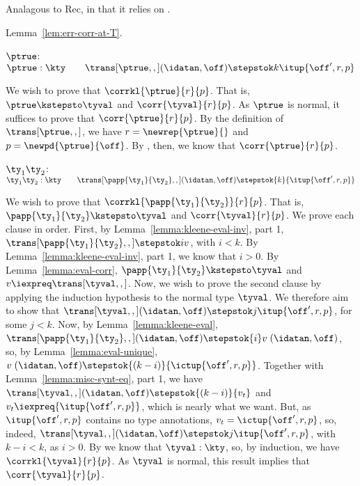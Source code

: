 \begin{list}{\textbf{Proof:}}{
      \setlength{\leftmargin}{0in}
      \setlength{\listparindent}{0in}}
\begin{caseproof}
Analagous to Rec, in that it relies on .
\end{caseproof}

\item Lemma~\ref{lem:err-corr-at-T}.
\begin{caseproof}
\item $\ptrue$: \quad $\ptrue : \kty \qquad
  \trans[\ptrue,,](\idatan,\off) \stepstok k {\itup{\off',r,p}}$

  We wish to prove that $\corrkl{\ptrue}{r}{p}$. That is, $\ptrue \kstepsto \tyval $
    and $\corr{\tyval}{r}{p}$. As $\ptrue$ is normal, it suffices to prove that $\corr{\ptrue}{r}{p}$.
  By the definition of $\trans[\ptrue,,]$, we have $r = \newrep{\ptrue}{}$ and $p = \newpd{\ptrue}{\off}$.
  By , then, we know that
     $\corr{\ptrue}{r}{p}$.

\item ${\ty_1} {\ty_2}$:\quad ${\ty_1} {\ty_2} : \kty \qquad 
  \trans[\papp {\ty_1} {\ty_2},,] (\idatan,\off) \stepstok{k}
  {\itup{\off',r,p}}$

  We wish to prove that $\corrkl{\papp {\ty_1}{\ty_2}}{r}{p}$. That
  is, $\papp {\ty_1} {\ty_2} \kstepsto \tyval $
    and $\corr{\tyval}{r}{p}$.
  We prove each clause in order. First, by Lemma~\ref{lemma:kleene-eval-inv}, part 1,
    $\trans[\papp {\ty_1} {\ty_2},,] \stepstok i v$, with $i < k$.
  By Lemma~\ref{lemma:kleene-eval-inv}, part 1, we know that
    $i > 0$.
  By Lemma~\ref{lemma:eval-corr},
    $\papp {\ty_1} {\ty_2} \kstepsto \tyval$ and $v \iexpreq
    \trans[\tyval,,]$.
  Now, we wish to prove the second clause by applying the induction
  hypothesis to the normal type $\tyval$. We therefore aim to show
  that $\trans[\tyval,,] (\idatan,\off) \stepstok j
  {\itup{\off',r,p}}$, for some $j < k$.
  Now, by Lemma~\ref{lemma:kleene-eval},
    $\trans[\papp {\ty_1} {\ty_2},,] (\idatan,\off) \stepstok{i} v \;
    (\idatan,\off)$, so, by Lemma~\ref{lemma:eval-unique},
     $v \; (\idatan,\off) \stepstok{(k-i)} {\ictup{\off',r,p}}$.
  Together with Lemma~\ref{lemma:misc-synt-eq}, part 1, we have
    $\trans[\tyval,,] (\idatan,\off) \stepstok{(k-i)} {v_t}$ and ${v_t}
    \iexpreq {\itup{\off',r,p}}$, which is nearly what we want.
  But, as $\itup{\off',r,p}$ contains no type annotations,
    $v_t = {\ictup{\off',r,p}}$, so, indeed, $\trans[\tyval,,] (\idatan,\off) \stepstok j
  {\itup{\off',r,p}}$, with $k-i < k$,  as $i >0$. 
  By  we know that $\tyval:\kty$, so,
  by induction, we have $\corrkl{\tyval}{r}{p}$. 
  As $\tyval$ is normal, this result implies that $\corr{\tyval}{r}{p}$.


\end{caseproof}
\end{list}

